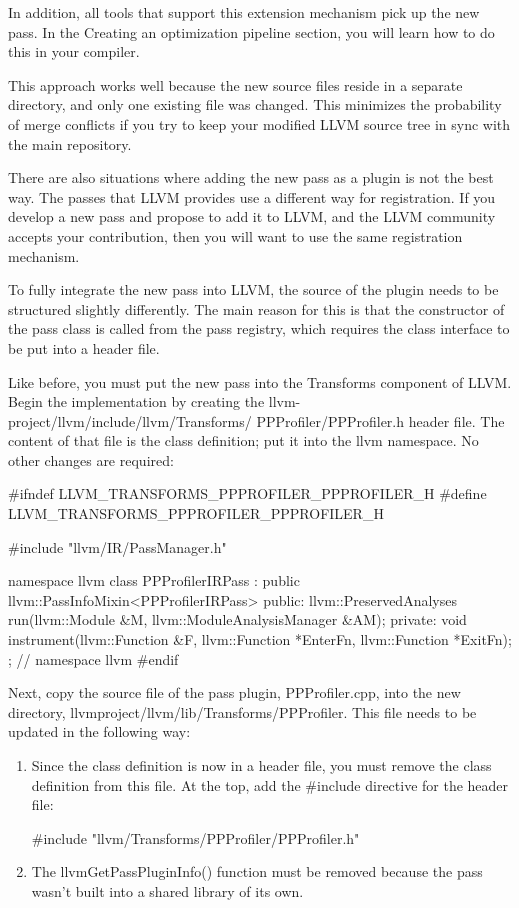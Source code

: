 In addition, all tools that support this extension mechanism pick up the new pass. In the Creating an optimization pipeline section, you will learn how to do this in your compiler.

This approach works well because the new source files reside in a separate directory, and only one existing file was changed. This minimizes the probability of merge conflicts if you try to keep your modified LLVM source tree in sync with the main repository.

There are also situations where adding the new pass as a plugin is not the best way. The passes that LLVM provides use a different way for registration. If you develop a new pass and propose to add it to LLVM, and the LLVM community accepts your contribution, then you will want to use the same registration mechanism.


To fully integrate the new pass into LLVM, the source of the plugin needs to be structured slightly differently. The main reason for this is that the constructor of the pass class is called from the pass registry, which requires the class interface to be put into a header file.

Like before, you must put the new pass into the Transforms component of LLVM. Begin the implementation by creating the llvm-project/llvm/include/llvm/Transforms/ PPProfiler/PPProfiler.h header file. The content of that file is the class definition; put it into the llvm namespace. No other changes are required:

\begin{cpp}
#ifndef LLVM_TRANSFORMS_PPPROFILER_PPPROFILER_H
#define LLVM_TRANSFORMS_PPPROFILER_PPPROFILER_H

#include "llvm/IR/PassManager.h"

namespace llvm {
class PPProfilerIRPass
    : public llvm::PassInfoMixin<PPProfilerIRPass> {
public:
    llvm::PreservedAnalyses
    run(llvm::Module &M, llvm::ModuleAnalysisManager &AM);
private:
    void instrument(llvm::Function &F,
                    llvm::Function *EnterFn,
                    llvm::Function *ExitFn);
};
} // namespace llvm
#endif
\end{cpp}

Next, copy the source file of the pass plugin, PPProfiler.cpp, into the new directory, llvmproject/llvm/lib/Transforms/PPProfiler. This file needs to be updated in the following way:

\begin{enumerate}
\item
Since the class definition is now in a header file, you must remove the class definition from this file. At the top, add the \#include directive for the header file:

\begin{cpp}
#include "llvm/Transforms/PPProfiler/PPProfiler.h"
\end{cpp}

\item
The llvmGetPassPluginInfo() function must be removed because the pass wasn’t built into a shared library of its own.
\end{enumerate}

